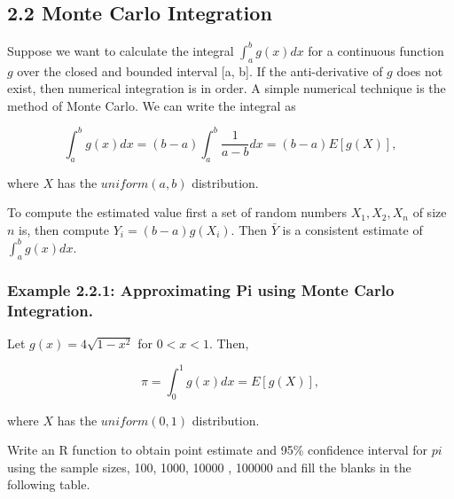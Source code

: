 \documentclass[]{article}
\begin{document}
\hypertarget{monte-carlo-integration}{%
\subsection{2.2 Monte Carlo Integration}\label{monte-carlo-integration}}

Suppose we want to calculate the integral \(\int_a^bg(x)dx\) for a
continuous function \(g\) over the closed and bounded interval {[}a,
b{]}. If the anti-derivative of \(g\) does not exist, then numerical
integration is in order. A simple numerical technique is the method of
Monte Carlo. We can write the integral as

\[\int_a^bg(x)dx=(b-a)\int_a^b\frac{1}{a-b}dx=(b-a)E[g(X)],\]

where \(X\) has the \(uniform(a, b)\) distribution.

To compute the estimated value first a set of random numbers
\(X_1, X_2, X_n\) of size \(n\) is, then compute \(Y_i = (b-a)g(X_i)\).
Then \(\bar{Y}\) is a consistent estimate of \(\int_a^bg(x)dx\).

\hypertarget{example-2.2.1-approximating-pi-using-monte-carlo-integration.}{%
\subsubsection{Example 2.2.1: Approximating Pi using Monte Carlo
Integration.}\label{example-2.2.1-approximating-pi-using-monte-carlo-integration.}}

Let \(g(x)=4\sqrt{1-x^2}\) for \(0 < x < 1\). Then,

\[\pi = \int_0^1g(x)dx = E[g(X)],\]

where \(X\) has the \(uniform(0, 1)\) distribution.

Write an R function to obtain point estimate and 95\% confidence
interval for \(pi\) using the sample sizes, 100, 1000, 10000 , 100000
and fill the blanks in the following table.
\end{document}
